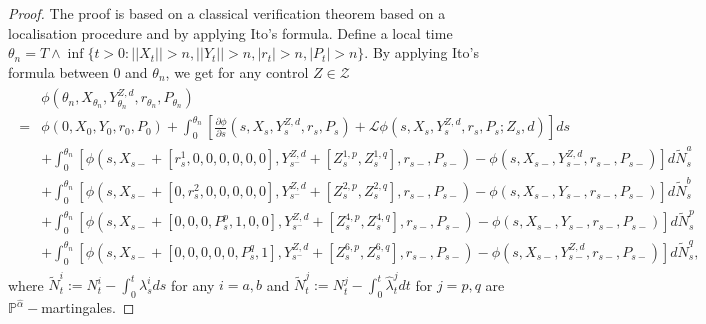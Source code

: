 \documentclass[12pt]{article}
\begin{document}
\begin{proof}
\label{proof:verification}
   The proof is based on a classical verification theorem based on a localisation procedure and by applying Ito's formula. Define a local time $\theta_n =T \wedge \inf\{ t>0:||X_t|| >n, ||Y_t|| >n ,|r_t| >n, |P_t| >n \}$. By applying Ito's formula between $0$ and $\theta_n$, we get for any control $Z\in \mathcal Z$ \begin{align}
    \begin{split}
    &\phi(\theta_n,X_{\theta_n},Y^{Z,d}_{\theta_n}, r_{\theta_n},P_{\theta_n}) \\
    = &\phi(0,X_0,Y_0,r_0,P_0) + \int_0^{\theta_n}[ \frac{\partial \phi}{\partial s} (s, X_s, Y^{Z,d}_s,r_s,P_s) +\mathcal L\phi (s, X_s, Y^{Z,d}_s,r_s,P_s; Z_s, d)]ds\\
    &+ \int_0^{\theta_n} [\phi(s,X_{s-}+[r^1_s , 0,0, 0,0,0,0],Y^{Z,d}_{s^-} +[Z^{1,p}_s,Z^{1,q}_s],r_{s-},P_{s-})  - \phi(s,X_{s-},Y^{Z,d}_{s-},r_{s-},P_{s-})]  d\tilde N_s^a\\
    &+ \int_0^{\theta_n} [\phi(s,X_{s-}+[0 , r^2_s,0, 0,0,0,0],Y^{Z,d}_{s^-} +[Z^{2,p}_s,Z^{2,q}_s],r_{s-},P_{s-})  - \phi(s,X_{s-},Y_{s-},r_{s-},P_{s-})]  d\tilde  N_s^b\\
    &+ \int_0^{\theta_n} [\phi(s,X_{s-}+[0 , 0,0, P_s^p,1,0,0],Y^{Z,d}_{s^-} +[Z^{4,p}_s,Z^{4,q}_s],r_{s-},P_{s-})  - \phi(s,X_{s-},Y_{s-},r_{s-},P_{s-})]  d\tilde  N_s^p\\
    &+ \int_0^{\theta_n} [\phi(s,X_{s-}+[0 , 0,0, 0,0,P_s^q,1],Y^{Z,d}_{s^-} +[Z^{6,p}_s,Z^{6,q}_s],r_{s-},P_{s-})  - \phi(s,X_{s-},Y^{Z,d}_{s-},r_{s-},P_{s-})]  d\tilde  N_s^q,
    \end{split}
    \label{eq:phi_ito}
\end{align}
where $\tilde N^i_t:=N^i_t-\int_0^t\lambda^i_sds$ for any $i=a,b$ and $\tilde N^j_t:=N^j_t-\int_0^t\hat\lambda^j_tdt$ for $j=p,q$ are $\mathbb P^{\hat\alpha}-$martingales.

\end{proof}
\end{document}
